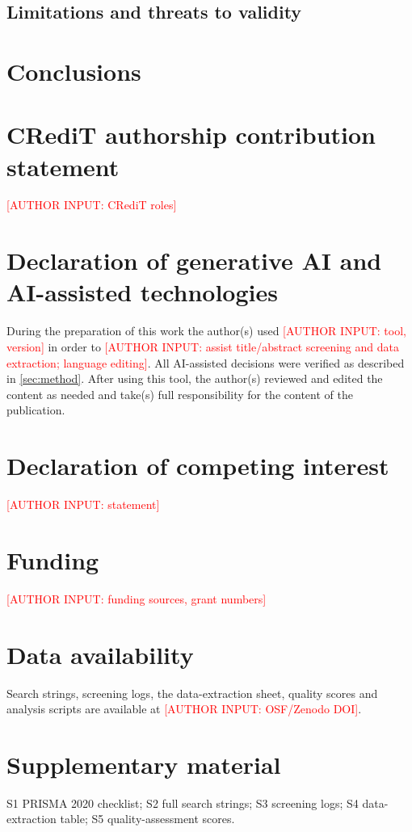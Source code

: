 \documentclass[11pt,a4paper]{article}
\newcommand{\authorinput}[1]{\textcolor{red}{[AUTHOR INPUT: #1]}}
\begin{document}
\subsection{Limitations and threats to validity}

\section{Conclusions}\label{sec:conclusion}

\section*{CRediT authorship contribution statement}
\authorinput{CRediT roles}

\section*{Declaration of generative AI and AI-assisted technologies}
During the preparation of this work the author(s) used \authorinput{tool, version} in order to \authorinput{assist title/abstract screening and data extraction; language editing}. All AI-assisted decisions were verified as described in \cref{sec:method}. After using this tool, the author(s) reviewed and edited the content as needed and take(s) full responsibility for the content of the publication.

\section*{Declaration of competing interest}
\authorinput{statement}

\section*{Funding}
\authorinput{funding sources, grant numbers}

\section*{Data availability}
Search strings, screening logs, the data-extraction sheet, quality scores and analysis scripts are available at \authorinput{OSF/Zenodo DOI}.




\appendix
\section*{Supplementary material}
S1 PRISMA 2020 checklist; S2 full search strings; S3 screening logs; S4 data-extraction table; S5 quality-assessment scores.
\end{document}
